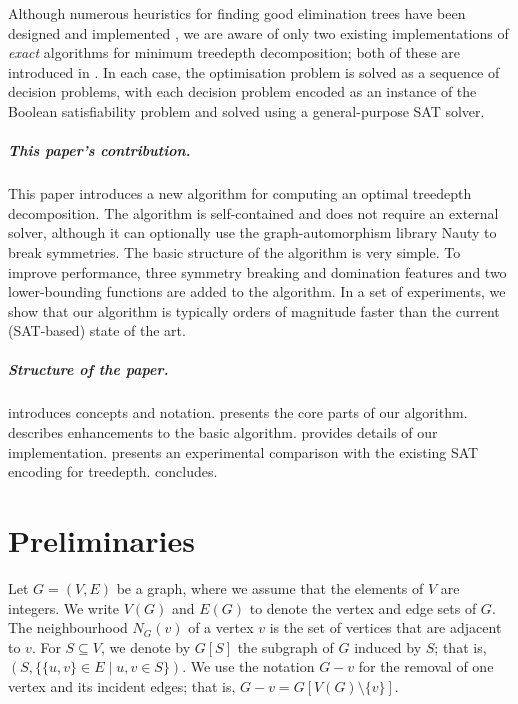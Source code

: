 {    Although numerous heuristics for finding good elimination trees have been designed
    and implemented \cite{groer2012inddgo},
    we are aware of only two existing implementations of \emph{exact} algorithms for minimum treedepth
    decomposition; both of these are introduced in \cite{DBLP:conf/alenex/GanianLOS19,DBLP:journals/corr/abs-1911-12995}.  In
    each case, the optimisation problem is solved as a sequence of decision problems,
    with each decision problem encoded as an instance of the Boolean satisfiability problem
    and solved using a general-purpose SAT solver.

    \subparagraph*{This paper's contribution.} This paper introduces a new algorithm for computing an optimal treedepth
    decomposition.  The algorithm is self-contained and does not require an external solver,
    although it can optionally use the graph-automorphism library Nauty to break symmetries.
    The basic structure of the
    algorithm is very simple.  To improve performance, three symmetry breaking and domination features
    and two lower-bounding functions are added to the algorithm.  In a set of experiments, we show that our
    algorithm is typically orders of magnitude faster than the current (SAT-based) state of the art.

    \subparagraph*{Structure of the paper.}  introduces concepts and notation.
     presents the core parts of our algorithm.  
    describes enhancements to the basic algorithm.   provides details of our implementation.
     presents an experimental comparison with the existing SAT encoding for treedepth.
     concludes.

    \section{Preliminaries}\label{sec:preliminaries}

    Let $G=(V,E)$ be a graph, where we assume that the elements of $V$ are integers.
    We write $V(G)$ and $E(G)$ to denote the vertex and edge sets of $G$.
    The neighbourhood $N_G(v)$ of a vertex $v$ is the set of vertices that are adjacent to $v$.
    For $S \subseteq V$, we denote by $G[S]$ the subgraph of $G$
    induced by $S$; that is, $(S, \{\{u,v\} \in E \mid u,v \in S\})$.
    We use the notation $G - v$ for the removal of one vertex and its incident edges;
    that is, $G - v = G[V(G) \setminus \{v\}]$.

}
